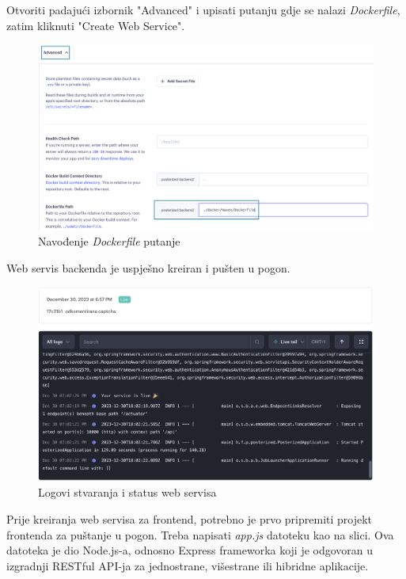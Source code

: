 			Otvoriti padajući izbornik "Advanced" i upisati putanju gdje se nalazi \textit{Dockerfile}, zatim kliknuti "Create Web Service".
			\begin{figure}[H]
				\includegraphics[scale=0.35]{slike/deploy/backend5.png} %
				\centering
				\caption{Navođenje \textit{Dockerfile} putanje}
				\label{fig:promjene}
			\end{figure}
			
			Web servis backenda je uspješno kreiran i pušten u pogon.
			\begin{figure}[H]
				\includegraphics[scale=0.4]{slike/deploy/backend6.png} %
				\centering
				\caption{Logovi stvaranja i status web servisa}
				\label{fig:promjene}
			\end{figure}
			
			\pagebreak
			Prije kreiranja web servisa za frontend, potrebno je prvo pripremiti projekt frontenda za puštanje u pogon.
			Treba napisati \textit{app.js} datoteku kao na slici. Ova datoteka je dio Node.js-a, odnosno Express frameworka koji je odgovoran u izgradnji RESTful API-ja za jednostrane, višestrane ili hibridne aplikacije.
			

